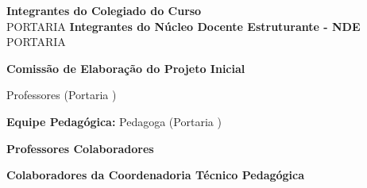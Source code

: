 \clearpage
\begin{center}
\textbf{Integrantes do Colegiado do Curso}\\
\vspace{0.5cm}
PORTARIA \PORTARIACOLEGIADOATUAL
\vspace{0.5cm}
\COLEGIADO
\vspace{0.5cm}
\textbf{Integrantes do Núcleo Docente Estruturante - NDE}\\
\vspace{0.5cm}
PORTARIA \PORTARIANDEATUAL
\vspace{0.5cm}
\NDE

\pagebreak
\vspace{1cm}

\textbf{Comissão de Elaboração do Projeto Inicial}

\vspace{0.5cm}
Professores (Portaria \PORTARIACOMISSAO)
\vspace{0.5cm}

\MakeUppercase{\COMISSAO}

\vspace{0.5cm}
\vspace{1cm}
\textbf{Equipe Pedagógica:}
Pedagoga (Portaria \PORTARIACOMISSAOALT)
\vspace{0.5cm}

\MakeUppercase{\PEDAGOGO}

\vspace{1cm}
\textbf{Professores Colaboradores}

\MakeUppercase{\COLABORADORES}

\vspace{1cm}
\textbf{Colaboradores da Coordenadoria Técnico Pedagógica}

\MakeUppercase{\PEDAGOGOS}
\end{center}